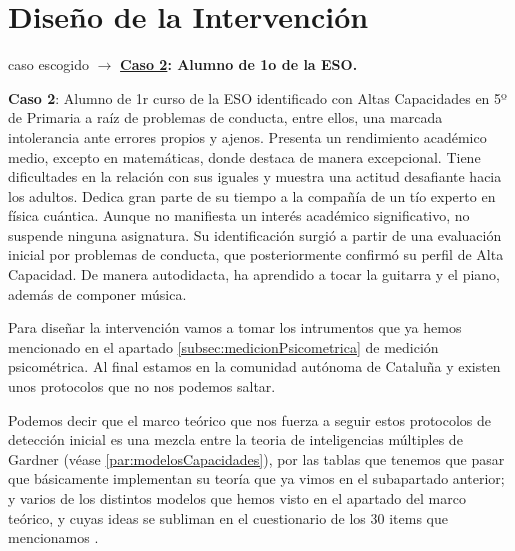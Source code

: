 \documentclass[12pt, a4paper]{article}
\begin{document}
	
	
	
	\newpage
	\section{Diseño de la Intervención}
	
	caso escogido $\rightarrow$ \textbf{\underline{Caso 2}: Alumno de 1o de la ESO.}
	
	
	
	
		\begin{tcolorbox}[
			colback=gray!10,
			colframe=gray!50,
			boxrule=0.5pt,
			arc=2mm
		]
		
		\textbf{Caso 2}: Alumno de 1r curso de la ESO identificado con Altas Capacidades en 5º de Primaria a raíz de problemas de conducta, entre ellos, una marcada intolerancia ante errores propios y ajenos. Presenta un rendimiento académico medio, excepto en matemáticas, donde destaca de manera excepcional. Tiene dificultades en la relación con sus iguales y muestra una actitud desafiante hacia los adultos. Dedica gran parte de su tiempo a la compañía de un tío experto en física cuántica. Aunque no manifiesta un interés académico significativo, no suspende ninguna asignatura. Su identificación surgió a partir de una evaluación inicial por problemas de conducta, que posteriormente confirmó su perfil de Alta Capacidad. De manera autodidacta, ha aprendido a tocar la guitarra y el piano, además de componer música.

		\end{tcolorbox}

	
	
	
	
	
	
	
	
	
	
	
	Para diseñar la intervención vamos a tomar los intrumentos que ya hemos mencionado en el apartado \ref{subsec:medicionPsicometrica} de medición psicométrica. Al final estamos en la comunidad autónoma de Cataluña y existen unos protocolos que no nos podemos saltar.
	
	Podemos decir que el marco teórico que nos fuerza a seguir estos protocolos de detección inicial es una mezcla entre la teoria de inteligencias múltiples de Gardner (véase \ref{par:modelosCapacidades}), por las tablas que tenemos que pasar que básicamente implementan su teoría \parencite[pp. 22--24 y 26 -- 28]{gencatAltesCapacitats2013} que ya vimos en el subapartado anterior; y varios de los distintos modelos que hemos visto en el apartado del marco teórico, y cuyas ideas se subliman en el cuestionario de los 30 items que mencionamos \parencite[19]{gencatAltesCapacitats2013}.
	
\end{document}
